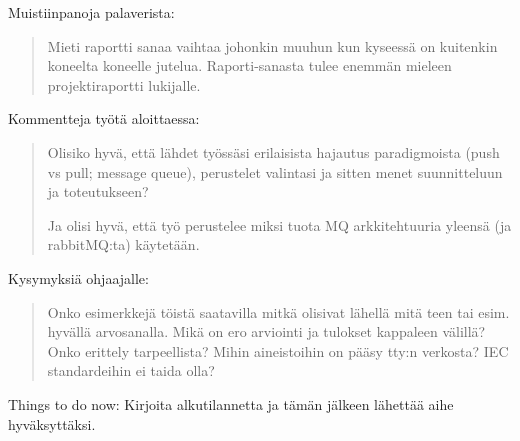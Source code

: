 Muistiinpanoja palaverista:
\begin{quote}
Mieti raportti sanaa vaihtaa johonkin muuhun kun kyseessä on kuitenkin koneelta koneelle jutelua. Raporti-sanasta tulee enemmän mieleen projektiraportti lukijalle.
\end{quote}

Kommentteja työtä aloittaessa:
\begin{quote}
	Olisiko hyvä, että lähdet työssäsi erilaisista hajautus paradigmoista (push vs pull; message queue), perustelet valintasi ja sitten menet suunnitteluun ja toteutukseen?
	
	Ja olisi hyvä, että työ perustelee miksi tuota MQ arkkitehtuuria yleensä (ja rabbitMQ:ta) käytetään.
\end{quote}

Kysymyksiä ohjaajalle:
\begin{quote}
	Onko esimerkkejä töistä saatavilla mitkä olisivat lähellä mitä teen tai esim. hyvällä arvosanalla.
	Mikä on ero arviointi ja tulokset kappaleen välillä? Onko erittely tarpeellista?
	Mihin aineistoihin on pääsy tty:n verkosta? IEC standardeihin ei taida olla?
\end{quote}

Things to do now:
Kirjoita alkutilannetta ja tämän jälkeen lähettää aihe hyväksyttäksi.